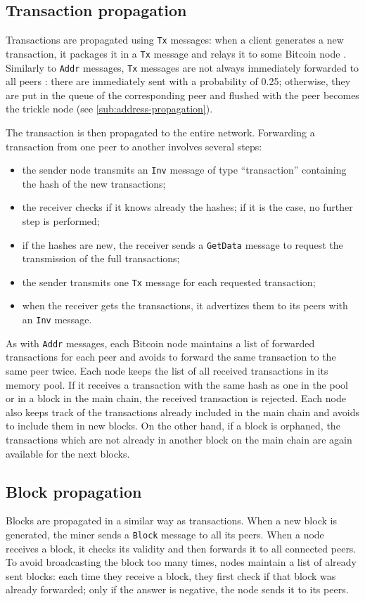 \subsection{Transaction propagation}
Transactions are propagated using \texttt{Tx} messages:
when a client generates a new transaction, it packages it in a \texttt{Tx} message and relays it to some Bitcoin node \cite{bitcoin_reference}.
Similarly to \texttt{Addr} messages, \texttt{Tx} messages are not always immediately forwarded to all peers \cite{deanonymisation_2014}:
there are immediately sent with a probability of \num{0.25};
otherwise, they are put in the queue of the corresponding peer and flushed with the peer becomes the trickle node (see \cref{sub:address-propagation}).

The transaction is then propagated to the entire network.
Forwarding a transaction from one peer to another involves several steps:
\begin{itemize}
	\item the sender node transmits an \texttt{Inv} message of type ``transaction'' containing the hash of the new transactions;
	\item the receiver checks if it knows already the hashes; if it is the case, no further step is performed;
	\item if the hashes are new, the receiver sends a \texttt{GetData} message to request the transmission of the full transactions;
	\item the sender transmits one \texttt{Tx} message for each requested transaction;
	\item when the receiver gets the transactions, it advertizes them to its peers with an \texttt{Inv} message.
\end{itemize}

As with \texttt{Addr} messages, each Bitcoin node maintains a list of forwarded transactions for each peer and avoids to forward the same transaction to the same peer twice.
Each node keeps the list of all received transactions in its memory pool.
If it receives a transaction with the same hash as one in the pool or in a block in the main chain, the received transaction is rejected.
Each node also keeps track of the transactions already included in the main chain and avoids to include them in new blocks.
On the other hand, if a block is orphaned, the transactions which are not already in another block on the main chain are again available for the next blocks.

\subsection{Block propagation}
Blocks are propagated in a similar way as transactions.
When a new block is generated, the miner sends a \texttt{Block} message to all its peers.
When a node receives a block, it checks its validity and then forwards it to all connected peers.
To avoid broadcasting the block too many times, nodes maintain a list of already sent blocks:
each time they receive a block, they first check if that block was already forwarded;
only if the answer is negative, the node sends it to its peers.

